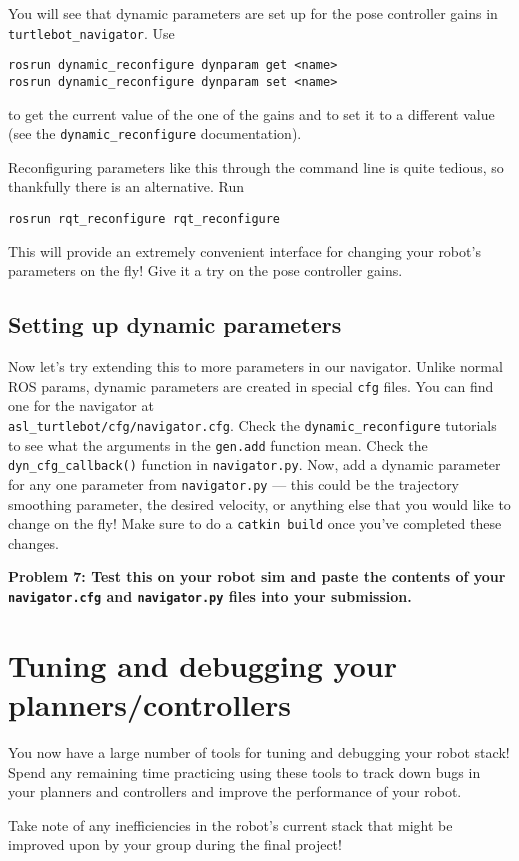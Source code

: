 \documentclass{article}
\begin{document}
You will see that dynamic parameters are set up for the pose controller gains in \texttt{turtlebot\_navigator}. Use 
\begin{lstlisting}
rosrun dynamic_reconfigure dynparam get <name>
rosrun dynamic_reconfigure dynparam set <name>
\end{lstlisting}

to get the current value of the one of the gains and to set it to a different value (see the \texttt{dynamic\_reconfigure} documentation).

Reconfiguring parameters like this through the command line is quite tedious, so thankfully there is an alternative. Run
\begin{lstlisting}
rosrun rqt_reconfigure rqt_reconfigure
\end{lstlisting}

This will provide an extremely convenient interface for changing your robot's parameters on the fly! Give it a try on the pose controller gains.

\subsection{Setting up dynamic parameters}
Now let's try extending this to more parameters in our navigator. Unlike normal ROS params, dynamic parameters are created in special \texttt{cfg} files. You can find one for the navigator at \\ \texttt{asl\_turtlebot/cfg/navigator.cfg}. Check the \texttt{dynamic\_reconfigure} tutorials to see what the arguments in the \texttt{gen.add} function mean. Check the \texttt{dyn\_cfg\_callback()} function in \texttt{navigator.py}. Now, add a dynamic parameter for any one parameter from \texttt{navigator.py} --- this could be the trajectory smoothing parameter, the desired velocity, or anything else that you would like to change on the fly! Make sure to do a \texttt{catkin build} once you've completed these changes.

{\bf Problem 7: Test this on your robot sim and paste the contents of your \texttt{navigator.cfg} and \texttt{navigator.py} files into your submission.}

\section{Tuning and debugging your planners/controllers}
You now have a large number of tools for tuning and debugging your robot stack! Spend any remaining time practicing using these tools to track down bugs in your planners and controllers and improve the performance of your robot.

Take note of any inefficiencies in the robot's current stack that might be improved upon by your group during the final project!
\end{document}
